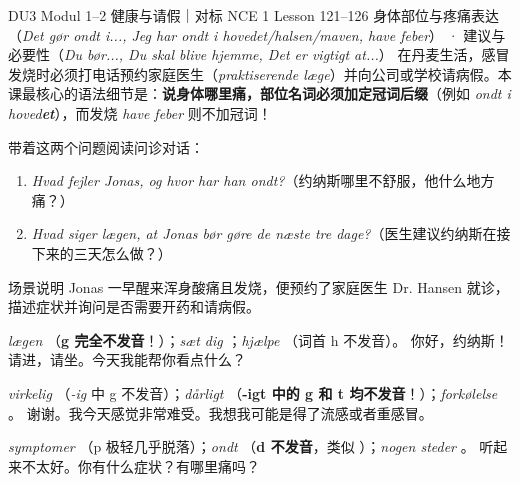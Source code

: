 {DU3 Modul 1--2 健康与请假｜对标 NCE 1 Lesson 121--126}
{身体部位与疼痛表达（\textit{Det gør ondt i..., Jeg har ondt i hovedet/halsen/maven, have feber}） · 建议与必要性（\textit{Du bør..., Du skal blive hjemme, Det er vigtigt at...}）}
{在丹麦生活，感冒发烧时必须打电话预约家庭医生（\textit{praktiserende læge}）并向公司或学校请病假。本课最核心的语法细节是：\textbf{说身体哪里痛，部位名词必须加定冠词后缀}（例如 \textit{ondt i hoved\textbf{et}}），而发烧 \textit{have feber} 则不加冠词！}

\begin{foerduleaeser}
带着这两个问题阅读问诊对话：
\begin{enumerate}
  \item \textit{Hvad fejler Jonas, og hvor har han ondt?}（约纳斯哪里不舒服，他什么地方痛？）
  \item \textit{Hvad siger lægen, at Jonas bør gøre de næste tre dage?}（医生建议约纳斯在接下来的三天怎么做？）
\end{enumerate}
\end{foerduleaeser}


\begin{tipbox}{场景说明}
Jonas 一早醒来浑身酸痛且发烧，便预约了家庭医生 Dr. Hansen 就诊，描述症状并询问是否需要开药和请病假。
\end{tipbox}

{\textit{lægen} （\textbf{g 完全不发音}！）；\textit{sæt dig} ；\textit{hjælpe} （词首 h 不发音）。}
{你好，约纳斯！请进，请坐。今天我能帮你看点什么？}

{\textit{virkelig} （\textit{-ig} 中 g 不发音）；\textit{dårligt} （\textbf{-igt 中的 g 和 t 均不发音}！）；\textit{forkølelse} 。}
{谢谢。我今天感觉非常难受。我想我可能是得了流感或者重感冒。}

{\textit{symptomer} （p 极轻几乎脱落）；\textit{ondt} （\textbf{d 不发音}，类似 ）；\textit{nogen steder} 。}
{听起来不太好。你有什么症状？有哪里痛吗？}

